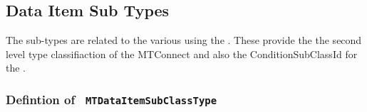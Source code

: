 \FloatBarrier
\subsection{Data Item Sub Types} \label{model:DataItemSubTypes}

The sub-types are related to the various  using the . 
These provide the the second level type classifiaction of the MTConnect  and 
also the ConditionSubClassId for the .

\subsubsection{Defintion of \texttt{ MTDataItemSubClassType}}
  \label{type:MTDataItemSubClassType}

